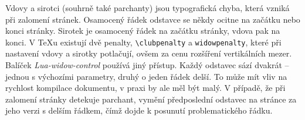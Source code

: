 \documentclass{csbulletin}
\newcommand\balicek[1]{\textit{#1}}
\begin{document}
Vdovy a sirotci (souhrně také parchanty) jsou typografická chyba, která vzniká
při zalomení stránek. Osamocený řádek odstavce se někdy ocitne na začátku nebo
konci stránky. Sirotek je osamocený řádek na začátku stránky, vdova pak na
konci. V \TeX u existují dvě penalty, \verb|\clubpenalty| a \verb|widowpenalty|,
které při nastavení vdovy a sirotky potlačují, ovšem za cenu rozšíření
vertikálních mezer. Balíček
\balicek{Lua-widow-control} \cite{lua-widow-control}
používá jiný přístup. Každý odstavec sází dvakrát -- jednou s výchozími
parametry, druhý o jeden řádek delší. To může mít vliv na rychlost kompilace
dokumentu, v praxi by ale měl být malý. V případě, že při zalomení stránky
detekuje parchant, vymění předposlední odstavec na stránce za jeho verzi s delším řádkem, čímž
dojde k posunutí problematického řádku.


% 
%   
% 
% 


\end{document}
